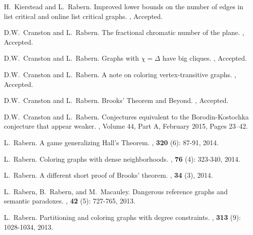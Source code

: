 \documentclass[10pt]{article}
\begin{document}
\begin{enumerate}[{[}1{]}]
	\item
H.~Kierstead and L.~Rabern.
\newblock Improved lower bounds on the number of edges in list critical and online list critical graphs.
, Accepted.

\item D.W.~Cranston and L.~Rabern.
	\newblock The fractional chromatic number of the plane.
	, Accepted.
	
\item D.W.~Cranston and L.~Rabern.
\newblock Graphs with $\chi = \Delta$ have big cliques.
, Accepted.	

\item D.W.~Cranston and L.~Rabern.
\newblock A note on coloring vertex-transitive graphs.
, Accepted.

\item
	D.W.~Cranston and L.~Rabern.
	\newblock Brooks' Theorem and Beyond.
	, Accepted.
	
\item D.W.~Cranston and L.~Rabern.
\newblock Conjectures equivalent to the Borodin-Kostochka conjecture that appear weaker.
, Volume 44, Part A, February 2015, Pages 23–42.

\item L.~Rabern.
\newblock A game generalizing Hall's Theorem.
, \textbf{320} (6): 87-91, 2014.

\item L.~Rabern.
\newblock Coloring graphs with dense neighborhoods.
, \textbf{76} (4): 323-340, 2014.

\item L.~Rabern.
\newblock A different short proof of Brooks' theorem.
, \textbf{34} (3), 2014.

\item L.~Rabern, B.~Rabern, and M.~Macauley.
\newblock Dangerous reference graphs and semantic paradoxes.
, \textbf{42} (5): 727-765, 2013.

\item L.~Rabern.
\newblock Partitioning and coloring graphs with degree constraints.
, \textbf{313} (9): 1028-1034, 2013.


\end{enumerate}
\end{document}
